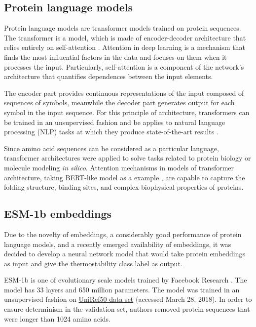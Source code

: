 \documentclass[12pt]{article}
\begin{document}
	\subsection{Protein language models}

	Protein language models are transformer models trained on protein sequences.
	The transformer is a model, which is made of encoder-decoder architecture 
	that relies entirely on self-attention \cite{vaswani2017attention}. 
	Attention in deep learning is a mechanism that finds the most influential
	factors in the data and focuses on them when it processes the input. 
	Particularly, self-attention is a component of the network's architecture
	that quantifies dependences between the input elements.

	The encoder part provides continuous representations of the input composed 
	of sequences of symbols, meanwhile the decoder part generates output for each 
	symbol in the input sequence. For this principle of architecture, transformers
	can be trained in an unsupervised fashion and be applies to natural language
	processing (NLP) tasks at which they produce state-of-the-art 
	results \cite{vig2019analyzing}.

	Since amino acid sequences can be considered as a particular language, 
	transformer architectures were applied to solve tasks related to protein 
	biology or molecule modeling \textit{in silico}. Attention mechanisms in 
	models of transformer architecture, taking BERT-like model as a example 
	\cite{vig2020bertology}, are capable to capture the folding structure, 
	binding sites, and complex biophysical properties of proteins.

	\subsection{ESM-1b embeddings}

	Due to the novelty of embeddings, a considerably good performance of
	protein language models, and a recently emerged availability of embeddings,
	it was decided to develop a neural network model that would take protein
	embeddings as input and give the thermostability class
	label as output.

	ESM-1b is one of evolutionary scale models trained by Facebook Research 
	\cite{rives2021biological}. The model has 33 layers and 650 million parameters. 
	The model was trained in an 
	unsupervised fashion on 
	\href{ftp://ftp.uniprot.org/pub/databases/uniprot/uniref/uniref50}{UniRef50 data set}
	(accessed March 28, 2018)\cite{suzek2015uniref}. In order 
	to ensure
	determinism in the validation set, authors removed protein sequences that
	were longer than 1024 amino acids. 
\end{document}
